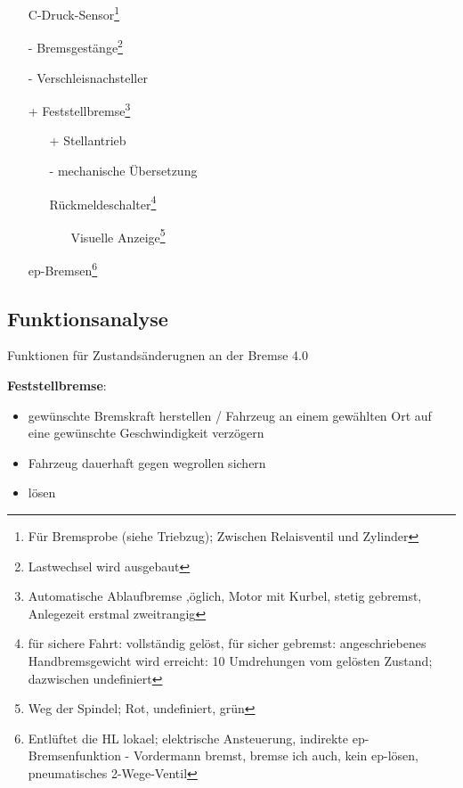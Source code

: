 \begin{itemize}
\begin{itemize}
        \item[-] Stufenweise Lastwechselumstelleinrichtung
        \begin{itemize}
            \item[+] Visuelle Zustandsanzeige
        \end{itemize}
        \item[+] Vorsteuerventil mit Rückmeldeschalter zur Lasteinstellung\footnote{bestromt=beladen; unbestromt=unbeladen}
    \end{itemize}
    \item[\textasteriskcentered] C-Druck-Sensor\footnote{Für Bremsprobe (siehe Triebzug); Zwischen Relaisventil und Zylinder}
    \item[-] Bremsgestänge\footnote{Lastwechsel wird ausgebaut}
    \item[-] Verschleisnachsteller
    \item[+] Feststellbremse\footnote{Automatische Ablaufbremse ,öglich, Motor mit Kurbel, stetig gebremst, Anlegezeit erstmal zweitrangig}
    \begin{itemize}
        \item[+] Stellantrieb
        \item[-] mechanische Übersetzung
        \item[\textasteriskcentered] Rückmeldeschalter\footnote{für sichere Fahrt: vollständig gelöst, für sicher gebremst: angeschriebenes Handbremsgewicht wird erreicht: 10 Umdrehungen vom gelösten Zustand; dazwischen undefiniert}
        \begin{itemize}
            \item[\textasteriskcentered] Visuelle Anzeige\footnote{Weg der Spindel; Rot, undefiniert, grün}
        \end{itemize}
    \end{itemize}
    \item[\textasteriskcentered] ep-Bremsen\footnote{Entlüftet die HL lokael; elektrische Ansteuerung, indirekte ep-Bremsenfunktion - Vordermann bremst, bremse ich auch, kein ep-lösen, pneumatisches 2-Wege-Ventil}
\end{itemize}

\subsection{Funktionsanalyse}
Funktionen für Zustandsänderugnen an der Bremse 4.0
\begin{fkt} \textbf{Feststellbremse}:
\begin{itemize}
    \item gewünschte Bremskraft herstellen / Fahrzeug an einem gewählten Ort auf eine gewünschte Geschwindigkeit verzögern
    \item Fahrzeug dauerhaft gegen wegrollen sichern
    \item lösen
\end{itemize}
\end{fkt}

